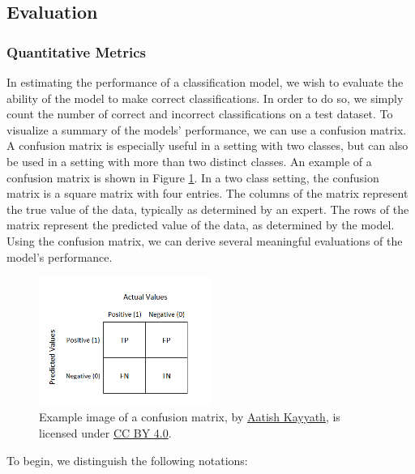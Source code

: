 \documentclass[12pt]{article}
\begin{document}
\newpage

\subsection{Evaluation}

\subsubsection{Quantitative Metrics}

In estimating the performance of a classification model, we wish to evaluate the
ability of the model to make correct classifications. In order to do so, we
simply count the number of correct and incorrect classifications on a test
dataset. To visualize a summary of the models' performance, we can use a
confusion matrix. A confusion matrix is especially useful in a setting with two
classes, but can also be used in a setting with more than two distinct classes.
An example of a confusion matrix is shown in Figure \ref{fig:matrix}. In a two
class setting, the confusion matrix is a square matrix with four entries. The
columns of the matrix represent the true value of the data, typically as
determined by an expert. The rows of the matrix represent the predicted value of
the data, as determined by the model. Using the confusion matrix, we can derive
several meaningful evaluations of the model's performance.

\begin{figure}[h]
    \centering
    \includegraphics[width=0.5\textwidth]{assets/images/cmatrix.png}
    \caption{Example image of a confusion matrix,
        by \href{https://medium.com/@aatish_kayyath/confusion-matrix-lets-clear-this-confusion-4b0bc5a5983c}{Aatish Kayyath}, is licensed under
        \href{https://creativecommons.org/licenses/by/4.0/}{CC BY 4.0}.}
    \label{fig:matrix}
\end{figure}

\newpage

To begin, we distinguish the following notations:
\end{document}
